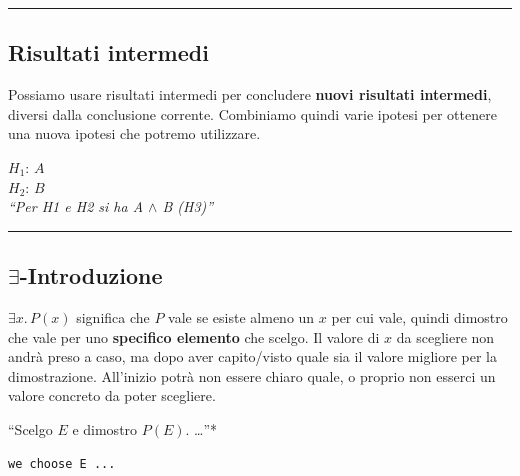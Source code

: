 \documentclass[
  a4paper,
]{article}
\begin{document}
\par\noindent\rule{\linewidth}{0.4pt}\par\vspace{6pt}

\hypertarget{risultati-intermedi}{%
\subsection{Risultati intermedi}\label{risultati-intermedi}}

Possiamo usare risultati intermedi per concludere \textbf{nuovi
risultati intermedi}, diversi dalla conclusione corrente. Combiniamo
quindi varie ipotesi per ottenere una nuova ipotesi che potremo
utilizzare.

\begin{examplebox}[Esempio]

\(H_1\): \(A\)\\
\(H_2\): \(B\)\\
\emph{``Per H1 e H2 si ha A \(\land\) B (H3)''}

\end{examplebox}

\par\noindent\rule{\linewidth}{0.4pt}\par\vspace{6pt}

\hypertarget{exists-introduzione}{%
\subsection{\texorpdfstring{\(\exists\)-Introduzione}{\textbackslash exists-Introduzione}}\label{exists-introduzione}}

\(\exists x.\,P(x)\) significa che \(P\) vale se esiste almeno un \(x\)
per cui vale, quindi dimostro che vale per uno \textbf{specifico
elemento} che scelgo. Il valore di \(x\) da scegliere non andrà preso a
caso, ma dopo aver capito/visto quale sia il valore migliore per la
dimostrazione. All'inizio potrà non essere chiaro quale, o proprio non
esserci un valore concreto da poter scegliere.

\begin{examplebox}[Esempio]

``Scelgo \(E\) e dimostro \(P(E)\). \ldots{}''*

\end{examplebox}

\begin{examplebox}

\begin{lstlisting}
we choose E ...
\end{lstlisting}

\end{examplebox}
\end{document}
